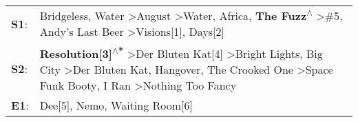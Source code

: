 \begin{supertabular}{p{0.03\textwidth}p{0.92\textwidth}}
 \textbf{S1}:  &                                   Bridgeless\textsuperscript{}, \enspace Water\textsuperscript{} \textgreater \enspace August\textsuperscript{} \textgreater \enspace Water\textsuperscript{}, \enspace Africa\textsuperscript{}, \enspace \textbf{The Fuzz\textsuperscript{$\wedge$}} \textgreater \enspace \#5\textsuperscript{}, \enspace Andy's Last Beer\textsuperscript{} \textgreater \enspace Visions[1]\textsuperscript{},  Days[2]\textsuperscript{}  \enspace  \\
 \textbf{S2}:  &  \textbf{Resolution[3]\textsuperscript{$\wedge$*}} \textgreater \enspace Der Bluten Kat[4]\textsuperscript{} \textgreater \enspace Bright Lights, Big City\textsuperscript{} \textgreater \enspace Der Bluten Kat\textsuperscript{}, \enspace Hangover\textsuperscript{}, \enspace The Crooked One\textsuperscript{} \textgreater \enspace Space Funk Booty\textsuperscript{}, \enspace I Ran\textsuperscript{} \textgreater \enspace Nothing Too Fancy\textsuperscript{}  \enspace  \\
 \textbf{E1}:  &                                                                                                                                                                                                                                                                                                                                                                     Dee[5]\textsuperscript{}, \enspace Nemo\textsuperscript{}, \enspace Waiting Room[6]\textsuperscript{}  \enspace  \\
\end{supertabular}
